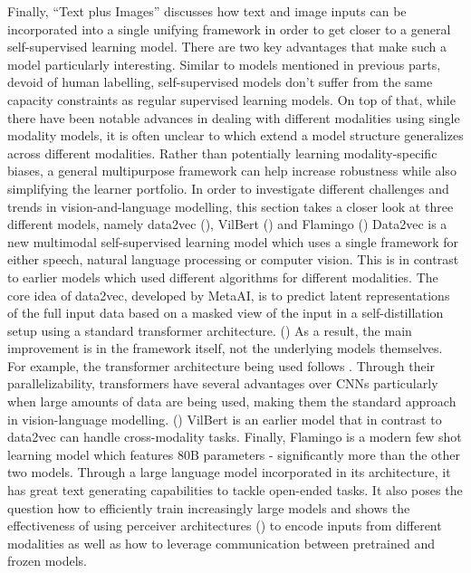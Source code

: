 \documentclass[
]{krantz}
\begin{document}
Finally, ``Text plus Images'' discusses how text and image inputs can be incorporated into a single unifying framework in order to get closer to a general self-supervised learning model.
There are two key advantages that make such a model particularly interesting.
Similar to models mentioned in previous parts, devoid of human labelling, self-supervised models don't suffer from the same capacity constraints as regular supervised learning models.
On top of that, while there have been notable advances in dealing with different modalities using single modality models, it is often unclear to which extend a model structure generalizes across different modalities.
Rather than potentially learning modality-specific biases, a general multipurpose framework can help increase robustness while also simplifying the learner portfolio.
In order to investigate different challenges and trends in vision-and-language modelling,
this section takes a closer look at three different models, namely data2vec (\citet{baevski2022data2vec}), VilBert (\citet{lu2019vilbert}) and Flamingo (\citet{alayrac2022flamingo})
Data2vec is a new multimodal self-supervised learning model which uses a single framework for either speech, natural language processing or computer vision.
This is in contrast to earlier models which used different algorithms for different modalities.
The core idea of data2vec, developed by MetaAI, is to predict latent representations of the full input data based on a masked view of the input in a self-distillation setup using a standard transformer architecture. (\citet{baevski2022data2vec})
As a result, the main improvement is in the framework itself, not the underlying models themselves.
For example, the transformer architecture being used follows \citet{vaswani2017attention}.
Through their parallelizability, transformers have several advantages over CNNs particularly when
large amounts of data are being used, making them the standard approach in vision-language modelling. (\citet{dosovitskiy2020image})
VilBert is an earlier model that in contrast to data2vec can handle cross-modality tasks.
Finally, Flamingo is a modern few shot learning model which features 80B parameters -
significantly more than the other two models. Through a large language model incorporated in its architecture, it has great text generating capabilities to tackle open-ended tasks. It also poses the question how to efficiently train increasingly large models and shows the effectiveness of using perceiver architectures (\citet{jaegle2021perceiver}) to encode inputs from different modalities as well as how to leverage communication between pretrained and frozen models.
\end{document}
